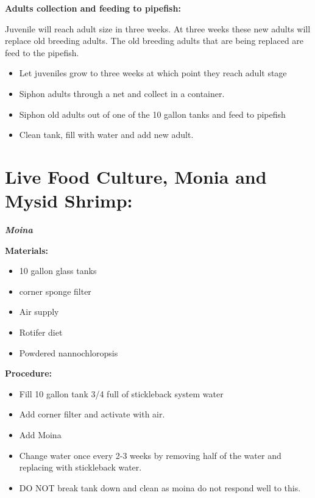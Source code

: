 \documentclass[
]{book}
\providecommand{\tightlist}{%
  \setlength{\itemsep}{0pt}\setlength{\parskip}{0pt}}
\begin{document}
\textbf{Adults collection and feeding to pipefish:}

Juvenile will reach adult size in three weeks. At three weeks these new adults will replace old breeding adults. The old breeding adults that are being replaced are feed to the pipefish.

\begin{itemize}
\tightlist
\item
  Let juveniles grow to three weeks at which point they reach adult stage
\item
  Siphon adults through a net and collect in a container.
\item
  Siphon old adults out of one of the 10 gallon tanks and feed to pipefish
\item
  Clean tank, fill with water and add new adult.
\end{itemize}

\newpage

\hypertarget{live-food-culture-monia-and-mysid-shrimp-1}{%
\section{Live Food Culture, Monia and Mysid Shrimp:}\label{live-food-culture-monia-and-mysid-shrimp-1}}

\textbf{\emph{Moina}}

\textbf{Materials:}

\begin{itemize}
\tightlist
\item
  10 gallon glass tanks
\item
  corner sponge filter
\item
  Air supply
\item
  Rotifer diet
\item
  Powdered nannochloropsis
\end{itemize}

\textbf{Procedure:}

\begin{itemize}
\tightlist
\item
  Fill 10 gallon tank 3/4 full of stickleback system water
\item
  Add corner filter and activate with air.
\item
  Add Moina
\item
  Change water once every 2-3 weeks by removing half of the water and replacing with stickleback water.
\item
  DO NOT break tank down and clean as moina do not respond well to this.
\end{itemize}
\end{document}
